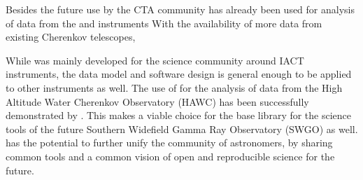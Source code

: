 Besides the future use by the CTA community \gammapy has already
been used for analysis of data from the \hess and \magic instruments
With the availability of more \gammaray data from existing Cherenkov
telescopes, \gammaray

While \gammapy was mainly developed for the science community around
IACT instruments, the data model and software design is general
enough to be applied to other \gammaray instruments as well.
The use of \gammapy for the analysis of data from the High Altitude
Water Cherenkov Observatory (HAWC) has been successfully
demonstrated by . This makes \gammapy
a viable choice for the base library for the science tools
of the future Southern Widefield Gamma Ray Observatory
(SWGO) as well. \gammapy has the potential to further unify the community
of \gammaray astronomers, by sharing common tools and
a common vision of open and reproducible science for the future.
